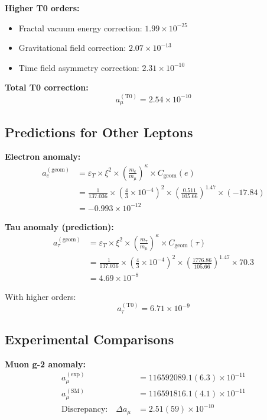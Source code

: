 \documentclass[12pt,a4paper]{article}
\begin{document}
\textbf{Higher T0 orders:}
\begin{itemize}
	\item Fractal vacuum energy correction: $1.99 \times 10^{-25}$
	\item Gravitational field correction: $2.07 \times 10^{-13}$
	\item Time field asymmetry correction: $2.31 \times 10^{-10}$
\end{itemize}

\textbf{Total T0 correction:}
\begin{equation}
	\boxed{a_\mu^{(\text{T0})} = 2.54 \times 10^{-10}}
\end{equation}

\subsection{Predictions for Other Leptons}

\textbf{Electron anomaly:}
\begin{align}
	a_e^{(\text{geom})} &= \varepsilon_T \times \xi^2 \times \left(\frac{m_e}{m_\mu}\right)^\kappa \times C_{\text{geom}}(e)\\
	&= \frac{1}{137.036} \times \left(\frac{4}{3} \times 10^{-4}\right)^2 \times \left(\frac{0.511}{105.66}\right)^{1.47} \times (-17.84)\\
	&= -0.993 \times 10^{-12}
\end{align}

\textbf{Tau anomaly (prediction):}
\begin{align}
	a_\tau^{(\text{geom})} &= \varepsilon_T \times \xi^2 \times \left(\frac{m_\tau}{m_\mu}\right)^\kappa \times C_{\text{geom}}(\tau)\\
	&= \frac{1}{137.036} \times \left(\frac{4}{3} \times 10^{-4}\right)^2 \times \left(\frac{1776.86}{105.66}\right)^{1.47} \times 70.3\\
	&= 4.69 \times 10^{-8}
\end{align}

With higher orders:
\begin{equation}
	\boxed{a_\tau^{(\text{T0})} = 6.71 \times 10^{-9}}
\end{equation}

\subsection{Experimental Comparisons}

\textbf{Muon g-2 anomaly:}
\begin{align}
	a_\mu^{(\text{exp})} &= 116592089.1(6.3) \times 10^{-11}\\
	a_\mu^{(\text{SM})} &= 116591816.1(4.1) \times 10^{-11}\\
	\text{Discrepancy:} \quad \Delta a_\mu &= 2.51(59) \times 10^{-10}
\end{align}
\end{document}
